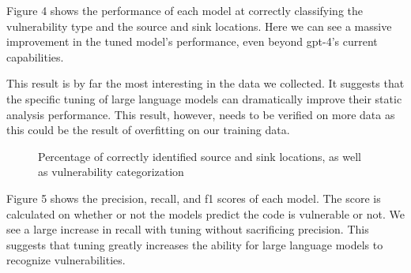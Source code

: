 \documentclass[acmsmall]{acmart}
\begin{document}
Figure 4 shows the performance of each model at correctly classifying the vulnerability type and the source and sink locations. Here we can see a massive improvement in the tuned model's performance, even beyond gpt-4's current capabilities. 

This result is by far the most interesting in the data we collected. It suggests that the specific tuning of large language models can dramatically improve their static analysis performance. This result, however, needs to be verified on more data as this could be the result of overfitting on our training data.\\
  

\begin{figure}[htp] 
\caption{Percentage of correctly identified source and sink locations, as well as vulnerability categorization}
\end{figure}

Figure 5 shows the precision, recall, and f1 scores of each model. The score is calculated on whether or not the models predict the code is vulnerable or not. We see a large increase in recall with tuning without sacrificing precision. This suggests that tuning greatly increases the ability for large language models to recognize vulnerabilities.\\
\end{document}
